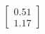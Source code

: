 \documentclass[preview]{standalone}
\begin{document}
\begin{align*}
\begin{bmatrix} 0.51 \\ 1.17 \end{bmatrix}
\end{align*}
\end{document}
